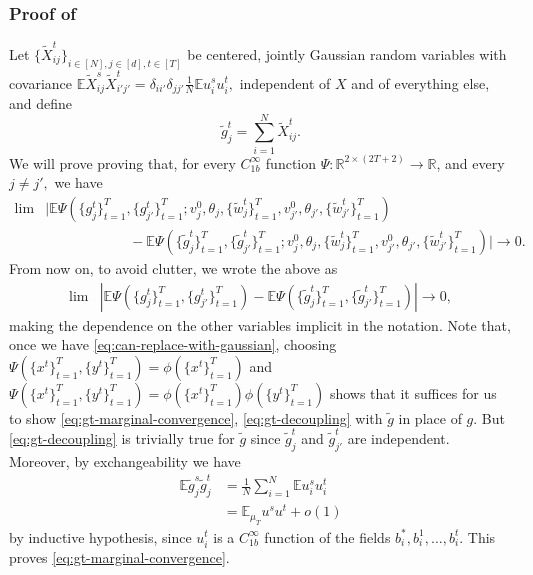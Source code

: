 \documentclass{article}
\newcommand{\1}{\mathbbm{1}}
\theoremstyle{plain}
\theoremstyle{definition}
\theoremstyle{remark}
\newcommand{\E}{\mathbb{E}}
\newcommand{\R}{\mathbb{R}}
\begin{document}
\subsubsection{Proof of }
Let $\{\tilde{X}_{ij}^t\}_{i\in [N], j\in [d], t\in [T]}$ be centered, jointly Gaussian random variables with covariance $\E \tilde{X}_{ij}^s\tilde{X}_{i'j'}^t = \delta_{ii'}\delta_{jj'}\frac{1}{N}\E u_i^{s}u_i^{t
},$ independent of $X$ and of everything else, and define 
    \[
    \tilde{g}_j^t = \sum_{i=1}^N \tilde{X}_{ij}^t.
    \]
We will prove proving that, for every $C^\infty_{1b}$ function $\Psi:\R^{2\times (2T+2)}\to\R$, and every $j\neq j',$ we have
    \begin{align}
            \lim &|\E\Psi( \{g_j^t\}_{t=1}^T,\{g_{j'}^t\}_{t=1}^T ;v^0_j,\theta_j,\{\tilde{w}_j^t\}_{t=1}^T, v^0_{j'},\theta_{j'},\{\tilde{w}_{j'}^t\}_{t=1}^T)\nonumber \\
            &\qquad \qquad \qquad - \E\Psi( \{\tilde{g}_j^t\}_{t=1}^T,\{\tilde{g}_{j'}^t\}_{t=1}^T ;v^0_j,\theta_j,\{\tilde{w}_j^t\}_{t=1}^T, v^0_{j'},\theta_{j'},\{\tilde{w}_{j'}^t\}_{t=1}^T) | \to 0. \nonumber
    \end{align}
    From now on, to avoid clutter, we wrote the above as 
    \begin{align}
            \lim &|\E\Psi( \{g_j^t\}_{t=1}^T,\{g_{j'}^t\}_{t=1}^T )- \E\Psi( \{\tilde{g}_j^t\}_{t=1}^T,\{\tilde{g}_{j'}^t\}_{t=1}^T) | \to 0,\label{eq:can-replace-with-gaussian}
    \end{align}
    making the dependence on the other variables implicit in the notation. Note that, once we have \eqref{eq:can-replace-with-gaussian}, choosing $\Psi(\{x^t\}_{t=1}^T, \{y^t\}_{t=1}^T) = \phi(\{x^t\}_{t=1}^T)$ and $\Psi(\{x^t\}_{t=1}^T, \{y^t\}_{t=1}^T) = \phi(\{x^t\}_{t=1}^T)\phi(\{y^t\}_{t=1}^T)$ shows that it suffices for us to show \eqref{eq:gt-marginal-convergence}, \eqref{eq:gt-decoupling} with $\tilde{g}$ in place of $g.$ But \eqref{eq:gt-decoupling} is trivially true for $\tilde{g}$ since $\tilde{g}^t_j$ and $\tilde{g}^t_{j'}$ are independent. Moreover, by exchangeability we have 
    \begin{align*}
        \E\tilde{g}_j^s \tilde{g}_j^t &= \frac{1}{N}\sum_{i=1}^N \E u_i^{s}u_i^{t} \\
        &= \E_{\mu_{T}} u^{s}u^{t}+ o(1)
    \end{align*}
    by inductive hypothesis, since $u_i^t$ is a $C^\infty_{1b}$ function of the fields $b^*_i, b^1_i,\dots,b^t_i$. This proves \eqref{eq:gt-marginal-convergence}.
    
\end{document}
